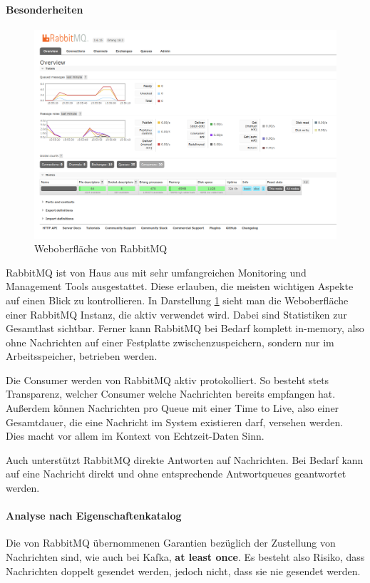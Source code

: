 \paragraph{Besonderheiten}
\begin{figure}
  \centering
  \includegraphics[width=.9\textwidth]{figures/rabbitmq.png}
  \caption{Weboberfläche von RabbitMQ}
  \label{rabbitmq:webinterface}
\end{figure}
RabbitMQ ist von Haus aus mit sehr umfangreichen Monitoring und Management Tools
ausgestattet. Diese erlauben, die meisten wichtigen Aspekte auf einen Blick
zu kontrollieren. In Darstellung \ref{rabbitmq:webinterface} sieht man die Weboberfläche einer RabbitMQ
Instanz, die aktiv verwendet wird. Dabei sind Statistiken zur Gesamtlast sichtbar.
Ferner kann RabbitMQ bei Bedarf komplett in-memory, also ohne Nachrichten auf
einer Festplatte zwischenzuspeichern, sondern nur im Arbeitsspeicher, betrieben
werden.

Die Consumer werden von RabbitMQ aktiv protokolliert. So besteht stets
Transparenz, welcher Consumer welche Nachrichten bereits empfangen hat.
Außerdem können Nachrichten pro Queue mit einer Time to Live, also einer
Gesamtdauer, die eine Nachricht im System existieren darf, versehen werden. Dies
macht vor allem im Kontext von Echtzeit-Daten Sinn.

Auch unterstützt RabbitMQ direkte Antworten auf Nachrichten. Bei Bedarf kann auf
eine Nachricht direkt und ohne entsprechende Antwortqueues geantwortet werden.

\paragraph{Analyse nach Eigenschaftenkatalog}
Die von RabbitMQ übernommenen Garantien bezüglich der Zustellung von Nachrichten sind,
wie auch bei Kafka, \textbf{at least once}. Es besteht also Risiko, dass Nachrichten
doppelt gesendet werden, jedoch nicht, dass sie nie gesendet werden.


